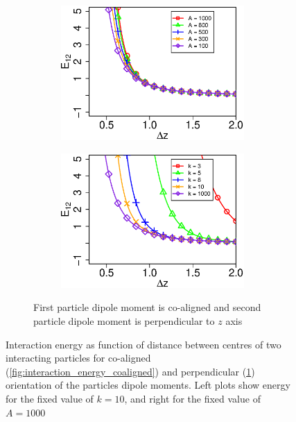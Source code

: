 \documentclass[12pt,a4paper]{article}
\begin{document}
\begin{figure}[h]
\begin{subfigure}{\textwidth}
\begin{subfigure}{.5\textwidth}
	\centering
	\includegraphics[width=\textwidth]{k=10_perp}
\end{subfigure}
\begin{subfigure}{.5\textwidth}
	\centering
	\includegraphics[width=\textwidth]{A=1000_perp}
\end{subfigure}
	\captionsetup{justification=centering, width=0.8\textwidth, singlelinecheck=false}
	\caption{First particle dipole moment is co-aligned and second particle dipole moment is perpendicular to $z$ axis}
    \label{fig:interaction_energy_counteraligned}
\end{subfigure}
\captionsetup{justification=centering, width=0.9\textwidth}
\caption{Interaction energy as function of distance between centres of two interacting particles for co-aligned (\ref{fig:interaction_energy_coaligned}) and perpendicular (\ref{fig:interaction_energy_counteraligned}) orientation of the particles dipole moments. Left plots show energy for the fixed value of $k = 10$, and right for the fixed value of $A = 1000$}
\label{fig:interaction_energy}
\end{figure}
\end{document}

